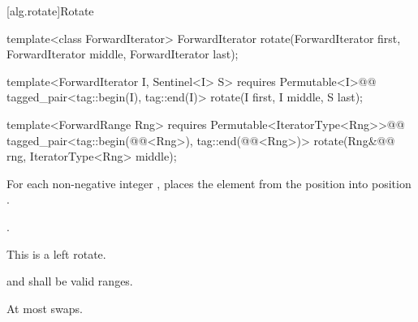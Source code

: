 [alg.rotate]{Rotate}

%
\begin{removedblock}
\begin{itemdecl}
template<class ForwardIterator>
  ForwardIterator rotate(ForwardIterator first, ForwardIterator middle,
              ForwardIterator last);
\end{itemdecl}
\end{removedblock}
\begin{addedblock}
\begin{itemdecl}
template<ForwardIterator I, Sentinel<I> S>
  requires Permutable<I>@\newtxt{()}@
  tagged_pair<tag::begin(I), tag::end(I)> rotate(I first, I middle, S last);

template<ForwardRange Rng>
  requires Permutable<IteratorType<Rng>>@\newtxt{()}@
  tagged_pair<tag::begin(@@<Rng>), tag::end(@@<Rng>)>
    rotate(Rng&@\newtxt{\&}@ rng, IteratorType<Rng> middle);
\end{itemdecl}
\end{addedblock}

\begin{itemdescr}
\pnum
\effects
For each non-negative integer
,
places the element from the position
into position
.

\pnum
\returns {}.

\pnum
\notes
This is a left rotate.

\pnum
\requires
{}
and
shall be valid ranges.

\pnum
\complexity
At most
swaps.
\end{itemdescr}

